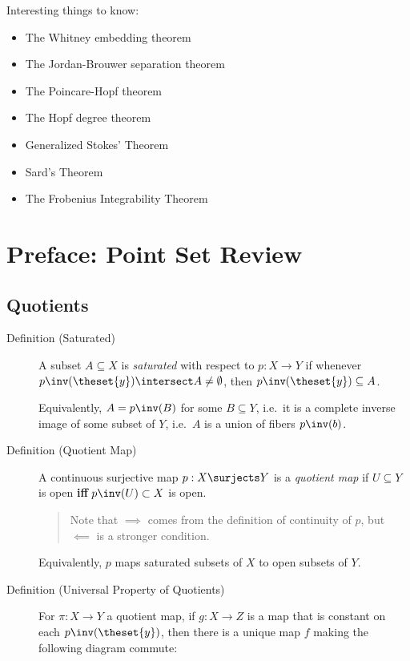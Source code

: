 Interesting things to know:

\begin{itemize}
\tightlist
\item
  The Whitney embedding theorem
\item
  The Jordan-Brouwer separation theorem
\item
  The Poincare-Hopf theorem
\item
  The Hopf degree theorem
\item
  Generalized Stokes' Theorem
\item
  Sard's Theorem
\item
  The Frobenius Integrability Theorem
\end{itemize}

\hypertarget{preface-point-set-review}{%
\section{Preface: Point Set Review}\label{preface-point-set-review}}

\hypertarget{quotients}{%
\subsection{Quotients}\label{quotients}}

\begin{description}
\item[Definition (Saturated)]
A subset \(A\subseteq X\) is \emph{saturated} with respect to
\(p:X\to Y\) if whenever
\(p\inv(\theset{y}) \intersect A \neq \emptyset\), then
\(p\inv(\theset{y}) \subseteq A\).

Equivalently, \(A = p\inv(B)\) for some \(B\subseteq Y\), i.e.~it is a
complete inverse image of some subset of \(Y\), i.e.~\(A\) is a union of
fibers \(p\inv(b)\).
\item[Definition (Quotient Map)]
A continuous surjective map \(p: X\surjects Y\) is a \emph{quotient map}
if \(U\subseteq Y\) is open \textbf{iff} \(p\inv(U) \subset X\) is open.

\begin{quote}
Note that \(\implies\) comes from the definition of continuity of \(p\),
but \(\impliedby\) is a stronger condition.
\end{quote}

Equivalently, \(p\) maps saturated subsets of \(X\) to open subsets of
\(Y\).
\item[Definition (Universal Property of Quotients)]
For \(\pi :X\to Y\) a quotient map, if \(g:X\to Z\) is a map that is
constant on each \(p\inv(\theset{y})\), then there is a unique map \(f\)
making the following diagram commute:

\begin{center}
\end{center}
\end{description}

